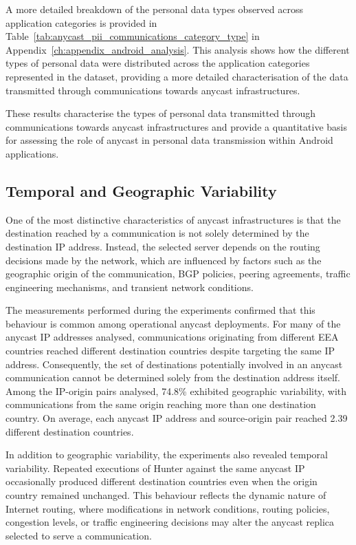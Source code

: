 A more detailed breakdown of the personal data types observed across application categories is provided in Table~\ref{tab:anycast_pii_communications_category_type} in Appendix~\ref{ch:appendix_android_analysis}. This analysis shows how the different types of personal data were distributed across the application categories represented in the dataset, providing a more detailed characterisation of the data transmitted through communications towards anycast infrastructures.

These results characterise the types of personal data transmitted through communications towards anycast infrastructures and provide a quantitative basis for assessing the role of anycast in personal data transmission within Android applications.

\subsection{Temporal and Geographic Variability}
\label{sc:anycast_experiments_variability}

One of the most distinctive characteristics of anycast infrastructures is that the destination reached by a communication is not solely determined by the destination IP address. Instead, the selected server depends on the routing decisions made by the network, which are influenced by factors such as the geographic origin of the communication, BGP policies, peering agreements, traffic engineering mechanisms, and transient network conditions.

The measurements performed during the experiments confirmed that this behaviour is common among operational anycast deployments. For many of the anycast IP addresses analysed, communications originating from different EEA countries reached different destination countries despite targeting the same IP address. Consequently, the set of destinations potentially involved in an anycast communication cannot be determined solely from the destination address itself. Among the IP-origin pairs analysed, 74.8\% exhibited geographic variability, with communications from the same origin reaching more than one destination country. On average, each anycast IP address and source-origin pair reached 2.39 different destination countries.

In addition to geographic variability, the experiments also revealed temporal variability. Repeated executions of Hunter against the same anycast IP occasionally produced different destination countries even when the origin country remained unchanged. This behaviour reflects the dynamic nature of Internet routing, where modifications in network conditions, routing policies, congestion levels, or traffic engineering decisions may alter the anycast replica selected to serve a communication.

